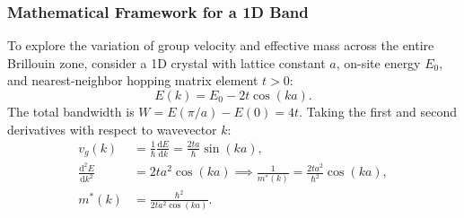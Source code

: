 \documentclass[11pt,a4paper]{article}
\newcommand{\dv}[2]{\frac{\mathrm{d}#1}{\mathrm{d}#2}}
\newcommand{\dvtwo}[2]{\frac{\mathrm{d}^2#1}{\mathrm{d}#2^2}}
\newcommand{\hb}{\hbar}
\newcommand{\hbarsq}{\hb^2}
\begin{document}
\subsubsection{Mathematical Framework for a 1D Band}
To explore the variation of group velocity and effective mass across the entire Brillouin zone, consider a 1D crystal with lattice constant $a$, on-site energy $E_0$, and nearest-neighbor hopping matrix element $t > 0$:
\begin{equation}
    E(k) = E_0 - 2t\cos(ka).
\end{equation}
The total bandwidth is $W = E(\pi/a) - E(0) = 4t$. Taking the first and second derivatives with respect to wavevector $k$:
\begin{align}
    v_g(k) &= \frac{1}{\hb}\dv{E}{k} = \frac{2ta}{\hb}\sin(ka), \label{eq:tb_vg} \\
    \dvtwo{E}{k} &= 2ta^2\cos(ka) \implies \frac{1}{m^*(k)} = \frac{2ta^2}{\hbarsq}\cos(ka), \label{eq:tb_curv} \\
    m^*(k) &= \frac{\hbarsq}{2ta^2\cos(ka)}. \label{eq:tb_mstar}
\end{align}
\end{document}
